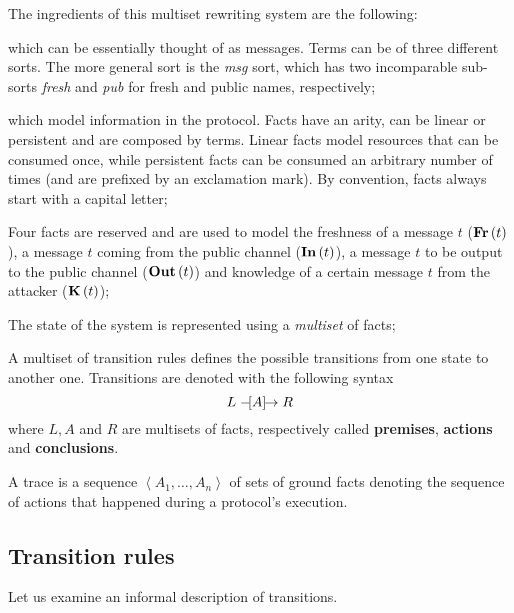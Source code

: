 The ingredients of this multiset rewriting system are the following:

\begin{description}[style=nextline]
  \item[Terms] which can be essentially thought of as messages. Terms can be of three different sorts. The more general sort is the \textit{msg} sort, which has two incomparable sub-sorts \textit{fresh} and \textit{pub} for fresh and public names, respectively;
  \item[Facts] which model information in the protocol. Facts have an arity, can be linear or persistent and are composed by terms. Linear facts model resources that can be consumed once, while persistent facts can be consumed an arbitrary number of times (and are prefixed by an exclamation mark). By convention, facts always start with a capital letter;
  \item[Special facts] Four facts are reserved and are used to model the freshness of a message $t$ ($\mbox{\textbf{Fr}}\left(t\right)$), a message $t$ coming from the public channel ($\mbox{\textbf{In}}\left(t\right)$), a message $t$ to be output to the public channel ($\mbox{\textbf{Out}}\left(t\right)$) and knowledge of a certain message $t$ from the attacker ($\mbox{\textbf{K}}\left(t\right)$);
  \item[State of the system] The state of the system is represented using a \textit{multiset} of facts;
  \item[Transition rules] A multiset of transition rules defines the possible transitions from one state to another one. Transitions are denoted with the following syntax
    \begin{equation}
      L \mathrel{-\hspace{-2pt}[A]\hspace{-4pt}\to} R
    \end{equation}
    where $L, A$ and $R$ are multisets of facts, respectively called \textbf{premises}, \textbf{actions} and \textbf{conclusions}.
  \item[Trace] A trace is a sequence $\left<A_1, \dots, A_n\right>$ of sets of ground facts denoting the sequence of actions that happened during a protocol's execution.
\end{description}


\subsection{Transition rules}
\label{sub:Transition-rules}
Let us examine an informal description of transitions.

